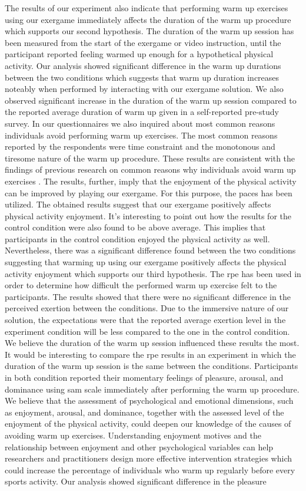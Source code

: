 The results of our experiment also indicate that performing warm up exercises using our exergame immediately affects the duration of the warm up procedure which supports our second hypothesis. The duration of the warm up session has been measured from the start of the exergame or video instruction, until the participant reported feeling warmed up enough for a hypothetical physical activity. Our analysis showed significant difference in the warm up durations between the two conditions which suggests that warm up duration increases noteably when performed by interacting with our exergame solution. We also observed significant increase in the duration of the warm up session compared to the reported average duration of warm up given in a self-reported pre-study survey. In our questionnaires we also inquired about most common reasons individuals avoid performing warm up exercises. The most common reasons reported by the respondents were time constraint and the monotonous and tiresome nature of the warm up procedure. These results are consistent with the findings of previous research on common reasons why individuals avoid warm up exercises \cite{fradkin2010effects}. The results, further, imply that the enjoyment of the physical activity can be improved by playing our exergame. For this purpose, the \acrlong{paces} has been utilized. The obtained results suggest that our exergame positively affects physical activity enjoyment. It's interesting to point out how the results for the control condition were also found to be above average. This implies that participants in the control condition enjoyed the physical activity as well.  Nevertheless, there was a significant difference found between the two conditions suggesting that warming up using our exergame positively affects the physical activity enjoyment which supports our third hypothesis. The \acrfull{rpe} has been used in order to determine how difficult the performed warm up exercise felt to the participants. The results showed that there were no significant difference in the perceived exertion between the conditions. Due to the immersive nature of our solution, the expectations were that the reported average exertion level in the experiment condition will be less compared to the one in the control condition. We believe the duration of the warm up session influenced these results the most. It would be interesting to compare the \acrshort{rpe} results in an experiment in which the duration of the warm up session is the same between the conditions. Participants in both condition reported their momentary feelings of pleasure, arousal, and dominance using  \acrlong{sam} scale immediately after performing the warm up procedure. We believe that the assessment of psychological and emotional dimensions, such as enjoyment, arousal, and dominance, together with the assessed level of the enjoyment of the physical activity, could deepen our knowledge of the causes of avoiding warm up exercises. Understanding enjoyment motives and the relationship between enjoyment and other psychological variables can help researchers and practitioners design more effective intervention strategies which could increase the percentage of individuals who warm up regularly before every sports activity. Our analysis showed significant difference in the pleasure 